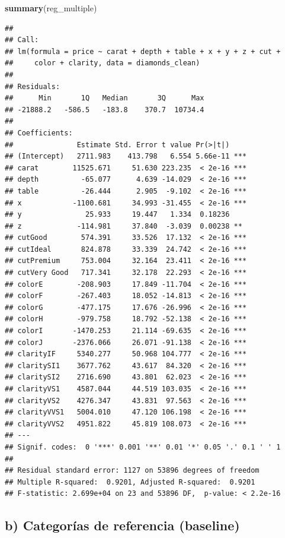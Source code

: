\documentclass[
  spanish,
]{article}
\newenvironment{Shaded}{\begin{snugshade}}{\end{snugshade}}
\newcommand{\FunctionTok}[1]{\textcolor[rgb]{0.13,0.29,0.53}{\textbf{#1}}}
\newcommand{\NormalTok}[1]{#1}
\begin{document}
\begin{Shaded}
\begin{Highlighting}[]
\FunctionTok{summary}\NormalTok{(reg\_multiple)}
\end{Highlighting}
\end{Shaded}

\begin{verbatim}
## 
## Call:
## lm(formula = price ~ carat + depth + table + x + y + z + cut + 
##     color + clarity, data = diamonds_clean)
## 
## Residuals:
##      Min       1Q   Median       3Q      Max 
## -21888.2   -586.5   -183.8    370.7  10734.4 
## 
## Coefficients:
##               Estimate Std. Error t value Pr(>|t|)    
## (Intercept)   2711.983    413.798   6.554 5.66e-11 ***
## carat        11525.671     51.630 223.235  < 2e-16 ***
## depth          -65.077      4.639 -14.029  < 2e-16 ***
## table          -26.444      2.905  -9.102  < 2e-16 ***
## x            -1100.681     34.993 -31.455  < 2e-16 ***
## y               25.933     19.447   1.334  0.18236    
## z             -114.981     37.840  -3.039  0.00238 ** 
## cutGood        574.391     33.526  17.132  < 2e-16 ***
## cutIdeal       824.878     33.339  24.742  < 2e-16 ***
## cutPremium     753.004     32.164  23.411  < 2e-16 ***
## cutVery Good   717.341     32.178  22.293  < 2e-16 ***
## colorE        -208.903     17.849 -11.704  < 2e-16 ***
## colorF        -267.403     18.052 -14.813  < 2e-16 ***
## colorG        -477.175     17.676 -26.996  < 2e-16 ***
## colorH        -979.758     18.792 -52.138  < 2e-16 ***
## colorI       -1470.253     21.114 -69.635  < 2e-16 ***
## colorJ       -2376.066     26.071 -91.138  < 2e-16 ***
## clarityIF     5340.277     50.968 104.777  < 2e-16 ***
## claritySI1    3677.762     43.617  84.320  < 2e-16 ***
## claritySI2    2716.690     43.801  62.023  < 2e-16 ***
## clarityVS1    4587.044     44.519 103.035  < 2e-16 ***
## clarityVS2    4276.347     43.831  97.563  < 2e-16 ***
## clarityVVS1   5004.010     47.120 106.198  < 2e-16 ***
## clarityVVS2   4951.822     45.819 108.073  < 2e-16 ***
## ---
## Signif. codes:  0 '***' 0.001 '**' 0.01 '*' 0.05 '.' 0.1 ' ' 1
## 
## Residual standard error: 1127 on 53896 degrees of freedom
## Multiple R-squared:  0.9201, Adjusted R-squared:  0.9201 
## F-statistic: 2.699e+04 on 23 and 53896 DF,  p-value: < 2.2e-16
\end{verbatim}

\subsection*{b) Categorías de referencia
(baseline)}\label{b-categoruxedas-de-referencia-baseline}
\end{document}
